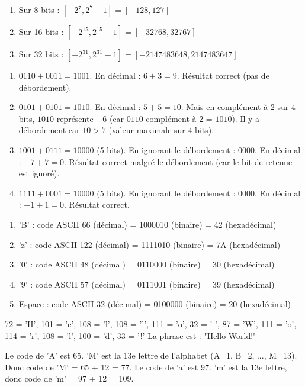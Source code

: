 \begin{enumerate}
    \item Sur 8 bits : $[-2^{7}, 2^{7}-1] = [-128, 127]$
    \item Sur 16 bits : $[-2^{15}, 2^{15}-1] = [-32768, 32767]$
    \item Sur 32 bits : $[-2^{31}, 2^{31}-1] = [-2147483648, 2147483647]$
\end{enumerate}

\begin{enumerate}
    \item $0110 + 0011 = 1001$. En décimal : $6 + 3 = 9$. Résultat correct (pas de débordement).
    \item $0101 + 0101 = 1010$. En décimal : $5 + 5 = 10$. Mais en complément à 2 sur 4 bits, $1010$ représente $-6$ (car $0110$ complément à 2 = $1010$). Il y a débordement car $10 > 7$ (valeur maximale sur 4 bits).
    \item $1001 + 0111 = 10000$ (5 bits). En ignorant le débordement : $0000$. En décimal : $-7 + 7 = 0$. Résultat correct malgré le débordement (car le bit de retenue est ignoré).
    \item $1111 + 0001 = 10000$ (5 bits). En ignorant le débordement : $0000$. En décimal : $-1 + 1 = 0$. Résultat correct.
\end{enumerate}

\begin{enumerate}
    \item 'B' : code ASCII 66 (décimal) = 1000010 (binaire) = 42 (hexadécimal)
    \item 'z' : code ASCII 122 (décimal) = 1111010 (binaire) = 7A (hexadécimal)
    \item '0' : code ASCII 48 (décimal) = 0110000 (binaire) = 30 (hexadécimal)
    \item '9' : code ASCII 57 (décimal) = 0111001 (binaire) = 39 (hexadécimal)
    \item Espace : code ASCII 32 (décimal) = 0100000 (binaire) = 20 (hexadécimal)
\end{enumerate}

72 = 'H', 101 = 'e', 108 = 'l', 108 = 'l', 111 = 'o', 32 = ' ', 87 = 'W', 111 = 'o', 114 = 'r', 108 = 'l', 100 = 'd', 33 = '!'
La phrase est : "Hello World!"

Le code de 'A' est 65. 'M' est la 13e lettre de l'alphabet (A=1, B=2, ..., M=13). Donc code de 'M' = 65 + 12 = 77.
Le code de 'a' est 97. 'm' est la 13e lettre, donc code de 'm' = 97 + 12 = 109.

